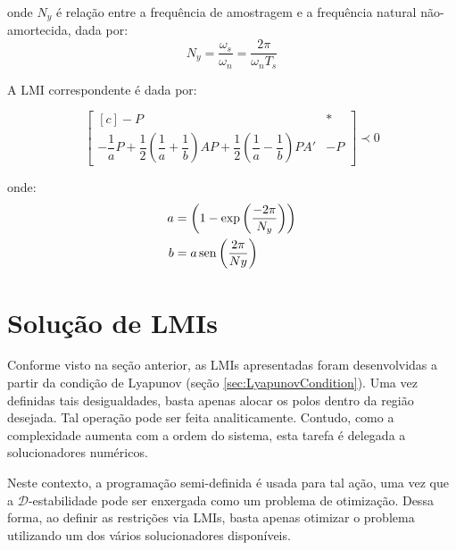 \noindent onde $N_y$ é relação entre a frequência de amostragem e a frequência natural não-amortecida, dada por:
\begin{equation}
  N_y = \dfrac{\omega_s}{\omega_n} = \dfrac{2\pi}{\omega_nT_s}\label{eq:ConstanteNy}
\end{equation}

A LMI correspondente é dada por:

\begin{equation}
  \begin{bmatrix*}[c]
    -P & *\\
    -\dfrac{1}{a}P + \dfrac{1}{2}\left(\dfrac{1}{a}+\dfrac{1}{b}\right)AP + \dfrac{1}{2}\left(\dfrac{1}{a}-\dfrac{1}{b}\right)PA' & -P
  \end{bmatrix*}
  \prec 0\label{eq:LMIElipse}
\end{equation}

\noindent onde:
\begin{subequations}
  \label{eq:PontosElipse}
  \begin{align}
    a &= \left(1-\exp{\left(\frac{-2\pi}{N_y}\right)}\right)\label{eq:PontoAElipse}\\
    b &= a\operatorname{sen}{\left(\frac{2\pi}{Ny}\right)}\label{eq:PontoBElipse}
  \end{align}
\end{subequations}

\section{Solução de LMIs}
Conforme visto na seção anterior, as LMIs apresentadas foram desenvolvidas a partir da condição de Lyapunov (seção \ref{sec:LyapunovCondition}). Uma vez definidas tais desigualdades, basta apenas alocar os polos dentro da região desejada. Tal operação pode ser feita analiticamente. Contudo, como a complexidade aumenta com a ordem do sistema, esta tarefa é delegada a solucionadores numéricos.

Neste contexto, a programação semi-definida é usada para tal ação, uma vez que a $\mathscr{D}$-estabilidade pode ser enxergada como um problema de otimização. Dessa forma, ao definir as restrições via LMIs, basta apenas otimizar o problema utilizando um dos vários solucionadores disponíveis.